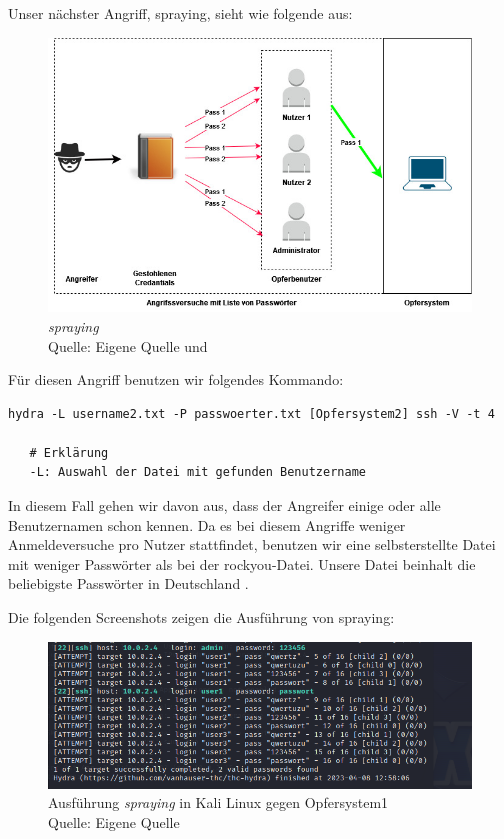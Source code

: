 \newpage
Unser nächster Angriff, \gls{spraying}, sieht wie folgende aus:
\begin{figure}[H]
   \centering
   \includegraphics[width=1\textwidth]{assets/Spraying.jpg}
   \caption{\textit{\gls{spraying}}\\Quelle: Eigene Quelle und \citep{Swathi_spraxy}}
   \centering
\end{figure}

Für diesen Angriff benutzen wir folgendes Kommando:
{
\begin{Verbatim}[frame=single]
   hydra -L username2.txt -P passwoerter.txt [Opfersystem2] ssh -V -t 4

   # Erklärung
   -L: Auswahl der Datei mit gefunden Benutzername
\end{Verbatim}
}

In diesem Fall gehen wir davon aus, dass der Angreifer einige oder alle Benutzernamen schon kennen. Da es bei diesem Angriffe weniger Anmeldeversuche pro Nutzer stattfindet, benutzen wir eine selbsterstellte Datei mit weniger Passwörter als bei der \gls{rockyou}-Datei. Unsere Datei beinhalt die beliebigste Passwörter in Deutschland \citep{silicon_passwort}.  

\newpage
Die folgenden Screenshots zeigen die Ausführung von \gls{spraying}:
\begin{figure}[H]
   \centering
   \includegraphics[width=1\textwidth]{assets/Spraying_Kali.png}
   \caption{Ausführung \textit{\gls{spraying}} in Kali Linux gegen Opfersystem1\\Quelle: Eigene Quelle}
   \centering
\end{figure}

